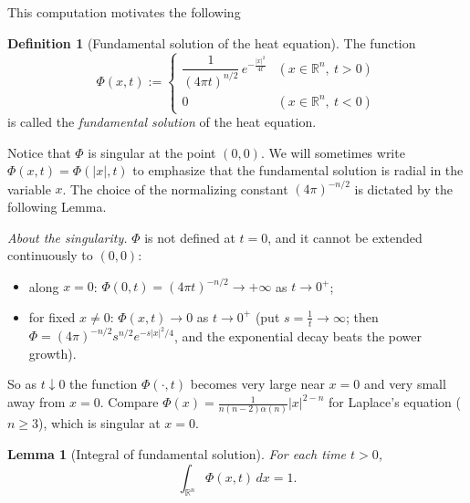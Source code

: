 \documentclass[11pt]{article}
\theoremstyle{plain}
\newtheorem{lemma}[theorem]{Lemma}
\theoremstyle{definition}
\newtheorem{definition}[theorem]{Definition}
\theoremstyle{remark}
\begin{document}
This computation motivates the following

\begin{definition}[Fundamental solution of the heat equation]\label{def:heatPhi}
The function
$$ \Phi(x,t) := \begin{cases} \dfrac{1}{(4\pi t)^{n/2}}\, e^{-\frac{|x|^2}{4t}} & (x \in \mathbb{R}^n,\ t > 0) \\[1em] 0 & (x \in \mathbb{R}^n,\ t < 0) \end{cases} $$
is called the \emph{fundamental solution} of the heat equation.
\end{definition}

Notice that $\Phi$ is singular at the point $(0,0)$. We will sometimes write $\Phi(x,t) = \Phi(|x|,t)$ to emphasize that the fundamental solution is radial in the variable $x$. The choice of the normalizing constant $(4\pi)^{-n/2}$ is dictated by the following Lemma.

\emph{About the singularity.} $\Phi$ is not defined at $t = 0$, and it cannot be extended continuously to $(0,0)$:
\begin{itemize}
    \item along $x = 0$: $\Phi(0,t) = (4\pi t)^{-n/2} \to +\infty$ as $t \to 0^+$;
    \item for fixed $x \neq 0$: $\Phi(x,t) \to 0$ as $t \to 0^+$ (put $s = \frac1t \to \infty$; then $\Phi = (4\pi)^{-n/2}s^{n/2}e^{-s|x|^2/4}$, and the exponential decay beats the power growth).
\end{itemize}
So as $t \downarrow 0$ the function $\Phi(\cdot,t)$ becomes very large near $x = 0$ and very small away from $x = 0$. Compare $\Phi(x) = \frac{1}{n(n-2)\alpha(n)}|x|^{2-n}$ for Laplace's equation ($n \ge 3$), which is singular at $x = 0$.

\begin{lemma}[Integral of fundamental solution]\label{lem:heatint}
For each time $t > 0$,
$$ \int_{\mathbb{R}^n}\Phi(x,t)\, dx = 1. $$
\end{lemma}
\end{document}
